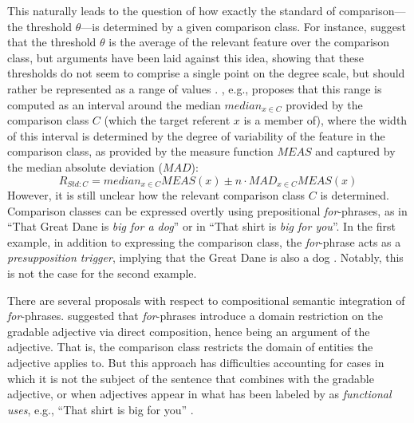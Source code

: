This naturally leads to the question of how exactly the standard of comparison---the threshold $\theta$---is determined by a given comparison class. For instance, \textcite{Cresswell1976} suggest that the threshold $\theta$ is the average of the relevant feature over the comparison class, but arguments have been laid against this idea, showing that these thresholds do not seem to comprise a single point on the degree scale, but should rather be represented as a range of values \parencite{Kennedy2007, vonStechow1984}. 
\textcite[p. 194]{Solt2009}, e.g., proposes that this range is computed as an interval around the median $median_{x\in C}$ provided by the comparison class $C$ (which the target referent $x$ is a member of), where the width of this interval is determined by the degree of variability of the feature in the comparison class, as provided by the measure function $MEAS$ and captured by the median absolute deviation ($MAD$):
\begin{equation}
R_{Std:C} = median_{x \in C} MEAS(x) \pm n \cdot MAD_{x \in C} MEAS(x)
\end{equation}
However, it is still unclear how the relevant comparison class $C$ is determined. Comparison classes can be expressed overtly using prepositional \textit{for}-phrases, as in “That Great Dane is \emph{big for a dog}” or in “That shirt is \emph{big for you}”. In the first example, in addition to expressing the comparison class, the \textit{for}-phrase acts as a \textit{presupposition trigger}, implying that the Great Dane is also a dog \parencite[cf.][]{Bale2011, Solt2009}. Notably, this is not the case for the second example. 

There are several proposals with respect to compositional semantic integration of \textit{for}-phrases. \textcite{Kennedy2007} suggested that \textit{for}-phrases introduce a domain restriction on the gradable adjective via direct composition, hence being an argument of the adjective. That is, the comparison class restricts the domain of entities the adjective applies to. But this approach has difficulties accounting for cases in which it is not the subject of the sentence that combines with the gradable adjective, or when adjectives appear in what has been labeled by \textcite{ebeling1994children} as \textit{functional uses}, e.g., “That shirt is big for you” \parencite{Solt2009}. 

